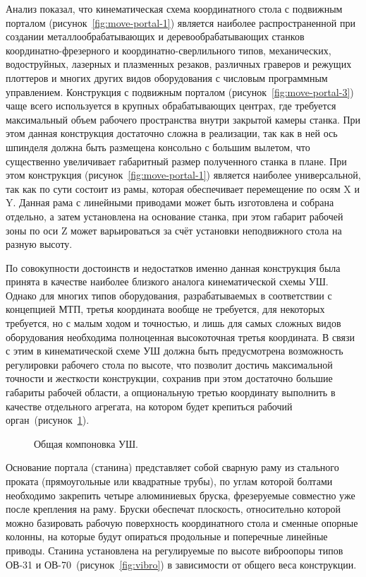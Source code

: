 Анализ показал, что кинематическая схема координатного стола с подвижным порталом (рисунок~\cref{fig:move-portal-1}) является наиболее распространенной при создании металлообрабатывающих и деревообрабатывающих станков координатно-фрезерного и координатно-сверлильного типов, механических, водоструйных, лазерных и плазменных резаков, различных граверов и режущих плоттеров и многих других видов оборудования с числовым программным управлением. Конструкция с подвижным порталом (рисунок~\cref{fig:move-portal-3}) чаще всего используется в крупных обрабатывающих центрах, где требуется максимальный объем рабочего пространства внутри закрытой камеры станка. При этом данная конструкция достаточно сложна в реализации, так как в ней ось шпинделя должна быть размещена консольно с большим вылетом, что существенно увеличивает габаритный размер полученного станка в плане. При этом конструкция (рисунок~\cref{fig:move-portal-1}) является наиболее универсальной, так как по сути состоит из рамы, которая обеспечивает перемещение по осям X и Y. Данная рама с линейными приводами может быть изготовлена и собрана отдельно, а затем установлена на основание станка, при этом габарит рабочей зоны по оси Z может варьироваться за счёт установки неподвижного стола на разную высоту.

По совокупности достоинств и недостатков именно данная конструкция была принята в качестве наиболее близкого аналога кинематической схемы УШ. Однако для многих типов оборудования, разрабатываемых в соответствии с концепцией МТП, третья координата вообще не требуется, для некоторых требуется, но с малым ходом и точностью, и лишь для самых сложных видов оборудования необходима полноценная высокоточная третья координата. В связи с этим в кинематической схеме УШ должна быть предусмотрена возможность регулировки рабочего стола по высоте, что позволит достичь максимальной точности и жесткости конструкции, сохранив при этом достаточно большие габариты рабочей области, а опциональную третью координату выполнить в качестве отдельного агрегата, на котором будет крепиться рабочий орган~(рисунок~\cref{fig:coord-chassis}).

\begin{figure}[ht]
	\caption{Общая компоновка УШ.}\label{fig:coord-chassis}
\end{figure}

Основание портала (станина) представляет собой сварную раму из стального проката (прямоугольные или квадратные трубы), по углам которой болтами необходимо закрепить четыре алюминиевых бруска, фрезеруемые совместно уже после крепления на раму. Бруски обеспечат плоскость, относительно которой можно базировать рабочую поверхность координатного стола и сменные опорные колонны, на которые будут опираться продольные и поперечные линейные приводы. Станина установлена на регулируемые по высоте виброопоры типов ОВ-31 и ОВ-70~(рисунок~\cref{fig:vibro}) в зависимости от общего веса конструкции.


